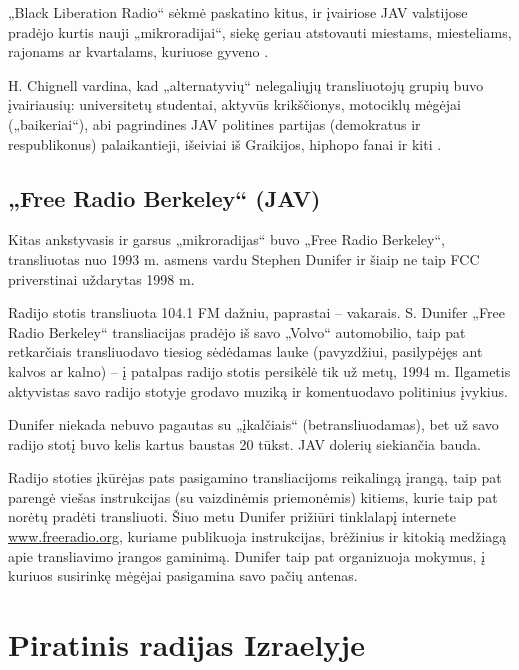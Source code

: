 \documentclass[kursinis-darbas]{vukf}
\begin{document}
„Black Liberation Radio“ sėkmė paskatino kitus, ir įvairiose JAV valstijose pradėjo kurtis nauji „mikroradijai“, siekę geriau atstovauti miestams, miesteliams, rajonams ar kvartalams, kuriuose gyveno \cite[p.~135]{hc_key_concepts_in_radio_studies}.

H. Chignell vardina, kad „alternatyvių“ nelegaliųjų transliuotojų grupių buvo įvairiausių: universitetų studentai, aktyvūs krikščionys, motociklų mėgėjai („baikeriai“), abi pagrindines JAV politines partijas (demokratus ir respublikonus) palaikantieji, išeiviai iš Graikijos, hiphopo fanai ir kiti \cite[p.~136]{hc_key_concepts_in_radio_studies}.


\subsection{„Free Radio Berkeley“ (JAV)}

Kitas ankstyvasis ir garsus „mikroradijas“ buvo „Free Radio Berkeley“, transliuotas nuo 1993 m. asmens vardu Stephen Dunifer ir šiaip ne taip \gls{FCC} priverstinai uždarytas 1998 m. \cite[p.~6]{tmc_fcc_enforcement_difficulties_with_unlicensed_micro_radio}

Radijo stotis transliuota 104.1 FM dažniu, paprastai – vakarais. S. Dunifer „Free Radio Berkeley“ transliacijas pradėjo iš savo „Volvo“ automobilio, taip pat retkarčiais transliuodavo tiesiog sėdėdamas lauke (pavyzdžiui, pasilypėjęs ant kalvos ar kalno) – į patalpas radijo stotis persikėlė tik už metų, 1994 m. Ilgametis aktyvistas savo radijo stotyje grodavo muziką ir komentuodavo politinius įvykius.

Dunifer niekada nebuvo pagautas su „įkalčiais“ (betransliuodamas), bet už savo radijo stotį buvo kelis kartus baustas 20 tūkst. JAV dolerių siekiančia bauda.

Radijo stoties įkūrėjas pats pasigamino transliacijoms reikalingą įrangą, taip pat parengė viešas instrukcijas (su vaizdinėmis priemonėmis) kitiems, kurie taip pat norėtų pradėti transliuoti. Šiuo metu Dunifer prižiūri tinklalapį internete \url{www.freeradio.org}, kuriame publikuoja instrukcijas, brėžinius ir kitokią medžiagą apie transliavimo įrangos gaminimą. Dunifer taip pat organizuoja mokymus, į kuriuos susirinkę mėgėjai pasigamina savo pačių antenas.


\section{Piratinis radijas Izraelyje}
\end{document}
